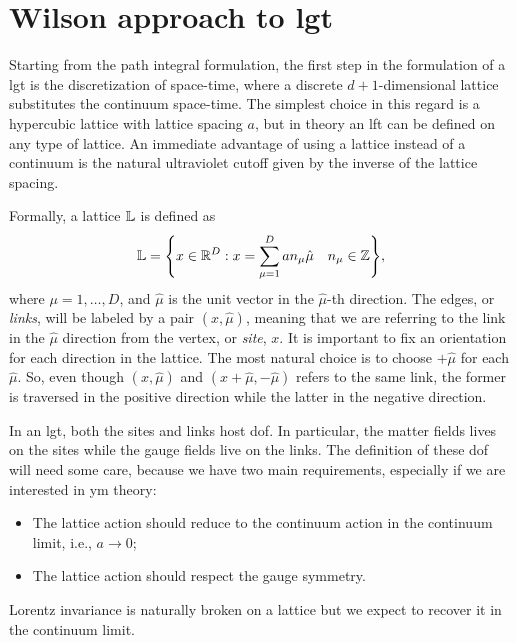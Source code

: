 \section{Wilson approach to \acl{lgt}}
\label{sec:wilson_approach_to_lft}

Starting from the path integral formulation, the first step in the formulation of a \ac{lgt} is the discretization of space-time, where a discrete $d+1$-dimensional lattice substitutes the continuum space-time.
The simplest choice in this regard is a hypercubic lattice with lattice spacing $a$, but in theory an \ac{lft} can be defined on any type of lattice.
An immediate advantage of using a lattice instead of a continuum is the natural ultraviolet cutoff given by the inverse of the lattice spacing.

Formally, a lattice $\mathbb{L}$ is defined as
\begin{equation}
    \mathbb{L} = \qty{
        x \in \mathbb{R}^{D} :
        x = \sum_{\mu = 1}^{D} a n_{\mu} \hat{\mu} \quad
        n_{\mu} \in \mathbb{Z}},
\end{equation}
where $\mu = 1, \dots, D$, and $\hat{\mu}$ is the unit vector in the $\hat{\mu}$-th direction.
The edges, or \emph{links}, will be labeled by a pair $(x,\hat{\mu})$, meaning that we are referring to the link in the $\hat{\mu}$ direction from the vertex, or \emph{site}, $x$.
It is important to fix an orientation for each direction in the lattice.
The most natural choice is to choose $+ \hat{\mu}$ for each $\hat{\mu}$.
So, even though $(x,\hat{\mu})$ and $(x + \hat{\mu}, - \hat{\mu})$ refers to the same link, the former is traversed in the positive direction while the latter in the negative direction.

In an \ac{lgt}, both the sites and links host \ac{dof}.
In particular, the matter fields lives on the sites while the gauge fields live on the links.
The definition of these \ac{dof} will need some care, because we have two main requirements, especially if we are interested in \ac{ym} theory:
\begin{itemize}
    \item The lattice action should reduce to the continuum action in the continuum limit, i.e., $a \to 0$;
    \item The lattice action should respect the gauge symmetry.
\end{itemize}
Lorentz invariance is naturally broken on a lattice but we expect to recover it in the continuum limit.


